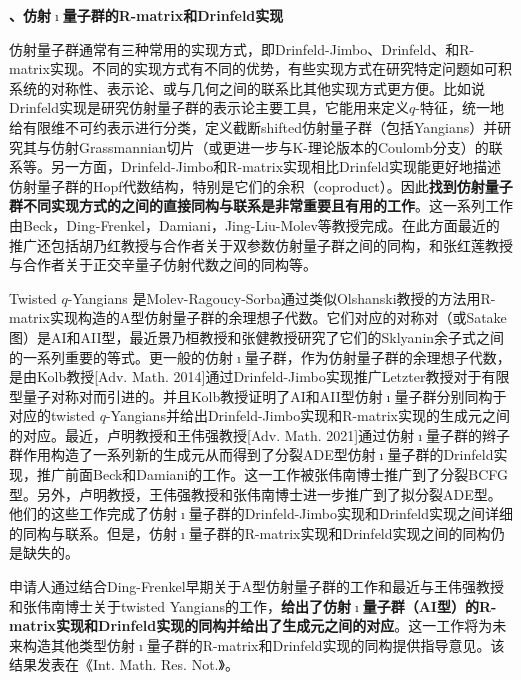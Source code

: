 \documentclass[12pt,UTF8,AutoFakeBold=4,a4paper]{ctexart}
\begin{document}

\medskip

\textbf{、仿射$\imath$量子群的R-matrix和Drinfeld实现}

仿射量子群通常有三种常用的实现方式，即Drinfeld-Jimbo、Drinfeld、和R-matrix实现。不同的实现方式有不同的优势，有些实现方式在研究特定问题如可积系统的对称性、表示论、或与几何之间的联系比其他实现方式更方便。比如说Drinfeld实现是研究仿射量子群的表示论主要工具，它能用来定义$q$-特征，统一地给有限维不可约表示进行分类，定义截断shifted仿射量子群（包括Yangians）并研究其与仿射Grassmannian切片（或更进一步与K-理论版本的Coulomb分支）的联系等。另一方面，Drinfeld-Jimbo和R-matrix实现相比Drinfeld实现能更好地描述仿射量子群的Hopf代数结构，特别是它们的余积（coproduct）。因此\textbf{找到仿射量子群不同实现方式的之间的直接同构与联系是非常重要且有用的工作}。这一系列工作由Beck，Ding-Frenkel，Damiani，Jing-Liu-Molev等教授完成。在此方面最近的推广还包括胡乃红教授与合作者关于双参数仿射量子群之间的同构，和张红莲教授与合作者关于正交辛量子仿射代数之间的同构等。

Twisted $q$-Yangians 是Molev-Ragoucy-Sorba通过类似Olshanski教授的方法用R-matrix实现构造的A型仿射量子群的余理想子代数。它们对应的对称对（或Satake图）是AI和AII型，最近景乃桓教授和张健教授研究了它们的Sklyanin余子式之间的一系列重要的等式。更一般的仿射$\imath$量子群，作为仿射量子群的余理想子代数，是由Kolb教授[Adv. Math. 2014]通过Drinfeld-Jimbo实现推广Letzter教授对于有限型量子对称对而引进的。并且Kolb教授证明了AI和AII型仿射$\imath$量子群分别同构于对应的twisted $q$-Yangians并给出Drinfeld-Jimbo实现和R-matrix实现的生成元之间的对应。最近，卢明教授和王伟强教授[Adv. Math. 2021]通过仿射$\imath$量子群的辫子群作用构造了一系列新的生成元从而得到了分裂ADE型仿射$\imath$量子群的Drinfeld实现，推广前面Beck和Damiani的工作。这一工作被张伟南博士推广到了分裂BCFG型。另外，卢明教授，王伟强教授和张伟南博士进一步推广到了拟分裂ADE型。他们的这些工作完成了仿射$\imath$量子群的Drinfeld-Jimbo实现和Drinfeld实现之间详细的同构与联系。但是，仿射$\imath$量子群的R-matrix实现和Drinfeld实现之间的同构仍是缺失的。

申请人通过结合Ding-Frenkel早期关于A型仿射量子群的工作和最近与王伟强教授和张伟南博士关于twisted Yangians的工作，\textbf{给出了仿射$\imath$量子群（AI型）的R-matrix实现和Drinfeld实现的同构并给出了生成元之间的对应}。这一工作将为未来构造其他类型仿射$\imath$量子群的R-matrix和Drinfeld实现的同构提供指导意见。该结果发表在《Int. Math. Res. Not.》。
\end{document}
